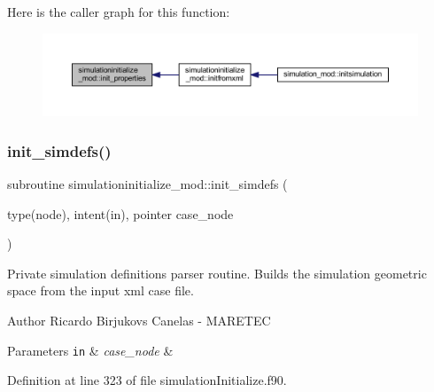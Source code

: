 Here is the caller graph for this function\+:\nopagebreak
\begin{figure}[H]
\begin{center}
\leavevmode
\includegraphics[width=350pt]{namespacesimulationinitialize__mod_a532cb4960e93dc27cff5dc2e04afe070_icgraph}
\end{center}
\end{figure}
\mbox{\label{namespacesimulationinitialize__mod_af6b2508d52e9e29aeb6e7dfbabd88e8d}} 
\subsubsection{\texorpdfstring{init\+\_\+simdefs()}{init\_simdefs()}}
{\footnotesize\ttfamily subroutine simulationinitialize\+\_\+mod\+::init\+\_\+simdefs (\begin{DoxyParamCaption}\item[{type(node), intent(in), pointer}]{case\+\_\+node }\end{DoxyParamCaption})\hspace{0.3cm}{\ttfamily [private]}}



Private simulation definitions parser routine. Builds the simulation geometric space from the input xml case file. 

\begin{DoxyAuthor}{Author}
Ricardo Birjukovs Canelas -\/ M\+A\+R\+E\+T\+EC 
\end{DoxyAuthor}

\begin{DoxyParams}[1]{Parameters}
\mbox{\tt in}  & {\em case\+\_\+node} & \\
\hline
\end{DoxyParams}


Definition at line 323 of file simulation\+Initialize.\+f90.



